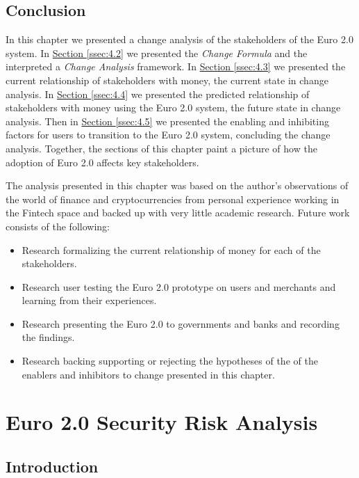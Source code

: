 \documentclass[a4paper,12pt]{article} %
\newcommand{\hypersectionref}[1]{\hyperref[#1]{Section \ref{#1}}}
\begin{document}
{\subsection{Conclusion} \label{ssec:4.6}

In this chapter we presented a change analysis of the stakeholders of the Euro 2.0 system. In \hypersectionref{ssec:4.2} we presented the \textit{Change Formula} and the interpreted a \textit{Change Analysis} framework. In \hypersectionref{ssec:4.3} we presented the  current relationship of stakeholders with money, the current state in change analysis. In \hypersectionref{ssec:4.4} we presented the  predicted relationship of stakeholders with money using the Euro 2.0 system, the future state in change analysis. Then in \hypersectionref{ssec:4.5} we presented the enabling and inhibiting factors for users to transition to the Euro 2.0 system, concluding the change analysis. Together, the sections of this chapter paint a picture of how the adoption of Euro 2.0 affects key stakeholders.

The analysis presented in this chapter was based on the author's observations of the world of finance and cryptocurrencies from personal experience working in the Fintech space and backed up with very little academic research. Future work consists of the following:

\begin{itemize}
	\item Research formalizing the current relationship of money for each of the stakeholders.
	\item Research user testing the Euro 2.0 prototype on users and merchants and learning from their experiences.
	\item Research presenting the Euro 2.0 to governments and banks and recording the findings.
	\item Research backing supporting or rejecting the hypotheses of the of the enablers and inhibitors to change presented in this chapter.
\end{itemize}

\pagebreak

\section{Euro 2.0 Security Risk Analysis} \label{sec:5}

\subsection{Introduction} \label{ssec:5:intro}

}
\end{document}
